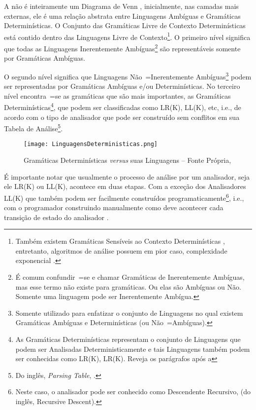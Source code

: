 A  não é inteiramente um Diagrama de Venn \cite{generalizedVennDiagrams},
inicialmente,
nas camadas mais externas,
ele é uma relação abstrata entre Linguagens Ambíguas e
Gramáticas Determinísticas.
O Conjunto das Gramáticas Livre de Contexto Determinísticas está contido dentro das Linguagens Livre de Contexto\footnote{
Também existem Gramáticas Sensíveis ao Contexto Determinísticas \cite{contextSensitiveParsing},
entretanto,
algoritmos de análise possuem em pior caso,
complexidade exponencial \cite{areContextSensitiveGrammarWithPolynomialTime}.
}.
O primeiro nível significa que todas as Linguagens Inerentemente Ambíguas\footnote{
É comum confundir~=se e
chamar Gramáticas de Inerentemente Ambíguas,
mas esse termo não existe para gramáticas.
Ou elas são Ambíguas ou
Não.
Somente uma linguagem pode ser Inerentemente Ambígua.
}
são representáveis somente por Gramáticas Ambíguas.

O segundo nível significa que Linguagens Não~=Inerentemente Ambíguas\footnote{
Somente utilizado para enfatizar o conjunto de Linguagens no qual existem Gramáticas Ambíguas e
Determinísticas (ou Não~=Ambíguas).
}
podem ser representadas por Gramáticas Ambíguas e\slash{}ou Determinísticas.
No terceiro nível encontra~=se as gramáticas que são mais importantes,
as Gramáticas Determinísticas\footnote{
As Gramáticas Determinísticas representam o conjunto de Linguagens que podem ser Analisadas Deterministicamente e
tais Linguagens também podem ser conhecidas como LR(K),
LR(K).
Reveja os parágrafos após a 
},
que podem ser classificadas como LR(K),
LL(K), etc, i.e.,
de acordo com o tipo de analisador que pode ser construído sem conflitos em sua Tabela de Análise\footnote{
Do inglês, \textit{Parsing Table},
\cite{ahoCompilerDragonBook}.
}.
\begin{figure}[h]
\centering
\texttt{[image: LinguagensDeterministicas.png]}
\caption[Gramáticas Determinísticas \textit{versus} suas Linguagens]{Gramáticas Determinísticas \textit{versus} suas Linguagens -- Fonte Própria,
}
\label{LinguagensDeterministicas}
\end{figure}

É importante notar que usualmente o processo de análise por um analisador,
seja ele LR(K) ou
LL(K),
acontece em duas etapas.
Com a exceção dos Analisadores LL(K) que também podem ser facilmente construídos programaticamente\footnote{
Neste caso,
o analisador pode ser conhecido como Descendente Recursivo,
(do inglês,
Recursive Descent).
},
i.e.,
com o programador construindo manualmente como deve acontecer cada transição de estado do analisador \cite{ahoCompilerDragonBook}.

